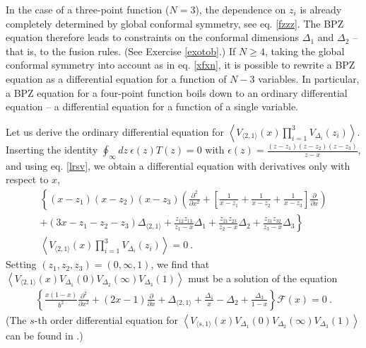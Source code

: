 \documentclass[12pt,a4paper,notitlepage]{report}
\numberwithin{equation}{section}
\theoremstyle{break}
\begin{document}
In the case of a three-point function ($N=3$), the dependence on $z_i$ is already completely determined by global conformal symmetry, see eq. \eqref{fzzz}.
The BPZ equation therefore leads to constraints on the conformal dimensions $\Delta_1$ and $\Delta_2$ -- that is, to the fusion rules. (See Exercise \ref{exotob}.) If $N\geq 4$, taking the global conformal symmetry into account as in eq. \eqref{xfxn}, it is possible to rewrite a BPZ equation as a differential equation for a function of $N-3$ variables.
In particular, a BPZ equation for a four-point function boils down to an ordinary differential equation -- a differential equation for a function of a single variable.  

Let us derive the ordinary differential equation for $\left\langle V_{\langle 2,1 \rangle}(x)\prod_{i=1}^3 V_{\Delta_i}(z_i)\right\rangle$.
Inserting the identity $\oint_\infty dz\ \epsilon(z) T(z) =0$ with $\epsilon(z) = \frac{(z-z_1)(z-z_2)(z-z_3)}{z-x}$, and using eq. \eqref{lrsv}, we obtain a differential equation with derivatives only with respect to $x$, 
\begin{multline}
  \left\{ (x-z_1)(x-z_2)(x-z_3)\left(\frac{\partial^2}{\partial x^2} +\left[\frac{1}{x-z_1}+\frac{1}{x-z_2}+\frac{1}{x-z_3}\right] {\frac{\partial}{\partial x}} \right) \right.
\\ 
\left. + (3x-z_1-z_2-z_3)\Delta_{\langle 2,1 \rangle} +\frac{z_{12}z_{13}}{z_1-x}\Delta_1 + \frac{z_{21}z_{23}}{z_2-x}\Delta_2+\frac{z_{31}z_{32}}{z_3-x}\Delta_3\right\} 
\\
\left\langle V_{\langle 2,1 \rangle}(x)\prod_{i=1}^3 V_{\Delta_i}(z_i)\right\rangle  = 0\ . 
\end{multline}
Setting $(z_1,z_2,z_3)=(0,\infty,1)$, we find that $\left\langle V_{\langle 2,1 \rangle}(x)V_{\Delta_1}(0)V_{\Delta_2}(\infty)V_{\Delta_3}(1)\right\rangle$ must be a solution of the equation
\begin{align}
  \left\{ \frac{x(1-x)}{b^2}\frac{\partial^2}{\partial x^2} + (2x-1){\frac{\partial}{\partial x}} +\Delta_{\langle 2,1 \rangle} +\frac{\Delta_1}{x}-\Delta_2 + \frac{\Delta_3}{1-x}\right\} \mathcal{F}(x)=0\ .
\label{sode}
\end{align}
(The $s$-th order differential equation for $\left\langle V_{\langle s,1 \rangle}(x)V_{\Delta_1}(0)V_{\Delta_2}(\infty)V_{\Delta_3}(1)\right\rangle $ can be found in \cite{flno09}.)
\end{document}
